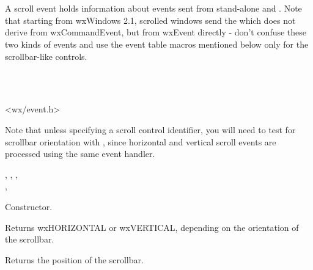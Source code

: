 \section{}\label{wxscrollevent}

A scroll event holds information about events sent from stand-alone
 and . Note that
starting from wxWindows 2.1, scrolled windows send the 
 which does not derive from
wxCommandEvent, but from wxEvent directly - don't confuse these two kinds of
events and use the event table macros mentioned below only for the
scrollbar-like controls.


\\
\\


<wx/event.h>




Note that unless specifying a scroll control identifier, you will need to test for scrollbar
orientation with , since
horizontal and vertical scroll events are processed using the same event handler.


, , , \\
, 




Constructor.

\label{wxscrolleventgetorientation}


Returns wxHORIZONTAL or wxVERTICAL, depending on the orientation of the scrollbar.

\label{wxscrolleventgetposition}


Returns the position of the scrollbar.

